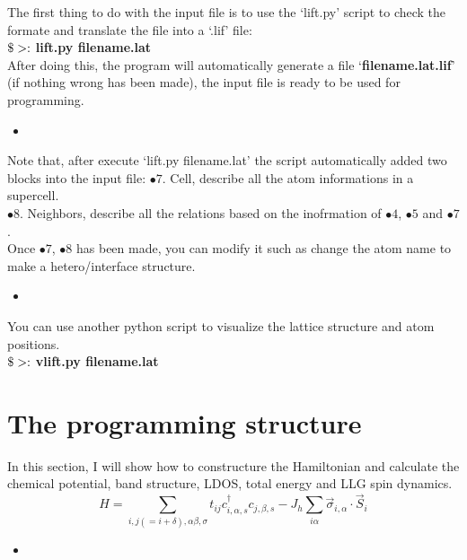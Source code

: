 \documentclass{article}
\newcommand{\codescript}[2]{
\begin{itemize}
\item[]
\end{itemize}
}
\newcommand{\docscript}[2]{
\begin{itemize}
\item[]
\end{itemize}
}
\begin{document}
The first thing to do with the input file is to use the `lift.py' script to check the formate and translate the file into a `.lif' file:\\
${\bf \$>:}$ {\bf lift.py filename.lat}\\
After doing this, the program will automatically generate a file `{\bf filename.lat.lif}' (if nothing wrong has been made), the input file is ready to be used for programming.

\docscript{00.Cubic.AFM.2x2x2.lat}{The input file format for a simple cubic structure}

Note that, after execute `lift.py filename.lat' the script automatically added two blocks into the input file:
$\bullet 7.$ Cell, describe all the atom informations in a supercell.\\
$\bullet 8.$ Neighbors, describe all the relations based on the inofrmation of $\bullet 4$, $\bullet 5$ and $\bullet 7$.\\

Once $\bullet 7$, $\bullet 8$ has been made, you can modify it such as change the atom name to make a hetero/interface structure.

\docscript{00.Cubic.AFM.2x2x2.lat.7-8}{The part after performing `lift.py filename.lat'}

You can use another python script to visualize the lattice structure and atom positions.\\
${\bf \$>:}$ {\bf vlift.py filename.lat}\\



\section{The programming structure}

In this section, I will show how to constructure the Hamiltonian and calculate the chemical potential, band structure, LDOS, total energy and LLG spin dynamics.
\begin{equation}
H = \sum_{i,j(=i+\delta),\alpha\beta,\sigma} t_{ij} c^\dagger_{i,\alpha,s} c_{j,\beta,s} - J_h\sum_{i\alpha} \vec \sigma_{i,\alpha} \cdot \vec S_i
\end{equation}

\codescript{code_example_003}{TBM$^3$ programming example}
\end{document}
